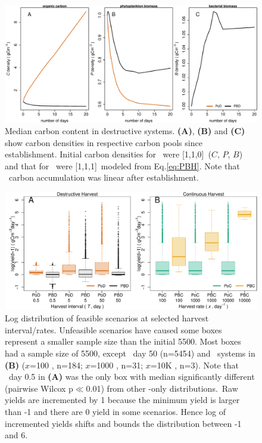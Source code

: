 \documentclass[../thesis.tex]{subfiles} %
\begin{document}
\begin{figure}[H]
    \centering
    \includegraphics[width=\linewidth]{result/Sample.pdf}
    \caption[Median carbon content in destructive systems]{Median carbon content in destructive systems.  \textbf{(A)}, \textbf{(B)} and \textbf{(C)} show carbon densities in respective carbon pools since establishment.  Initial carbon densities for \PoN\ were [1,1,0]\den\ ($C$, $P$, $B$) and that for \PBN\ were [1,1,1]\den\ modeled from Eq.\ref{eq:PBH}.  Note that \PoN\ carbon accumulation was linear after establishment.}
    \label{f:destCarbon}
\end{figure}

\begin{figure}[H]
    \centering
    \includegraphics[width=\linewidth]{result/Harvest.pdf}
    \caption[Yield flux distribution by harvest mode]{Log distribution of feasible scenarios at selected harvest interval/rates.  Unfeasible scenarios have caused some boxes represent a smaller sample size than the initial 5500.  Most boxes had a sample size of 5500, except \PBN\ day 50 (n=5454) and \PBH\ systems in \textbf{(B)} ($x$=100 \dayU, n=184; $x$=1000 \dayU, n=31; $x$=10K \dayU, n=3).  Note that \PoN\ day 0.5 in \textbf{(A)} was the only box with median significantly different (pairwise Wilcox p$\ll$0.01) from other \phy-only distributions.\pAExplain\  Raw yields are incremented by 1 because the minimum yield is larger than -1 and there are 0 yield in some scenarios.  Hence log of incremented yields shifts and bounds the distribution between -1 and 6.}
    \label{f:ydByHarv}
\end{figure}
\end{document}
